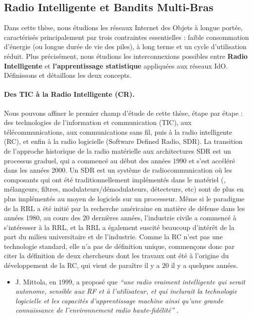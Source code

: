 \begin{resume_fr}
\section*{Radio Intelligente et Bandits Multi-Bras}

Dans cette thèse, nous étudions les réseaux Internet des Objets à longue portée, caractérisés principalement par trois contraintes essentielles :
faible consommation d'énergie (ou longue durée de vie des piles),
à long terme
et un cycle d'utilisation réduit.
%
Plus précisément, nous étudions les interconnexions possibles entre \textbf{Radio Intelligente} et \textbf{l'apprentissage statistique} appliquées aux réseaux IdO.
Définissons et détaillons les deux concepts.


\paragraph{Des TIC à la Radio Intelligente (CR).}
%
Nous pouvons affiner le premier champ d'étude de cette thèse, étape par étape :
des technologies de l'information et communication (TIC), aux télécommunications, aux communications sans fil, puis à la radio intelligente (RC),
et enfin à la radio logicielle (Software Defined Radio, SDR).
%
La transition de l'approche historique de la radio matérielle aux architectures SDR est un processus graduel, qui a commencé au début des années 1990 et s'est accéléré dans les années 2000.
Un SDR est un système de radiocommunication où les composants qui ont été traditionnellement implémentés dans le matériel (\eg, mélangeurs, filtres, modulateurs/démodulateurs, détecteurs, etc) sont de plus en plus implémentés au moyen de logiciels sur un processeur.
%
Même si le paradigme de la RRL a été initié par la recherche américaine en matière de défense dans les années 1980, au cours des 20 dernières années, l'industrie civile a commencé à s'intéresser à la RRL, et la RRL a également suscité beaucoup d'intérêt de la part du milieu universitaire et de l'industrie.
%
Comme la RC n'est pas une technologie standard, elle n'a pas de définition unique, commençons donc par citer la définition de deux chercheurs dont les travaux ont été à l'origine du développement de la RC, qui vient de paraître il y a $20$ il y a quelques années.
%
\begin{itemize}
    \item
    J. Mittola, en $1999$, a proposé que
    \emph{``une radio vraiment intelligente qui serait autonome, sensible aux RF et à l'utilisateur, et qui inclurait la technologie logicielle et les capacités d'apprentissage machine ainsi qu'une grande connaissance de l'environnement radio haute-fidélité''} \cite{Mitola99}.


\end{itemize}
\end{resume_fr}
